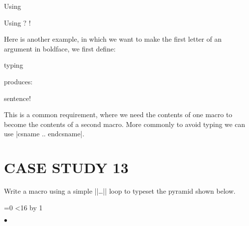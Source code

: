 \begin{teX}
\begin{teX}
\begin{teX}
\begin{teX}
\begin{teX}
\begin{teX}
Using 

\begin{texexample}{Using }{}
\def\letters{xyz}
\def\lookatletters#1#2#3{First arg=#1,Second arg=#2, Third arg=#3 }
\expandafter\lookatletters\letters  ? !
\end{texexample}




Here is another example, in which we want to make the first letter of an argument in boldface, we first define:
\begin{teX}
\def\nextbf#1{{\bf #1}}
\def\meintext{Example sentence!}
\end{teX}
typing
\begin{teX}
\expandafter\nextbf\meintext
\end{teX}

\def\nextbf#1{{\bf #1}}
\def\meintext{Example sentence!}

\noindent produces:

\smallskip
\expandafter\nextbf\meintext
\bigskip



This is a common requirement, where we need the contents of one macro to become the contents of
a second macro. More commonly to avoid typing we can use |csname .. endcsname|.




\chapter{CASE STUDY 13}
Write a macro using a simple |\loop|\ldots|\repeat| loop to typeset the pyramid shown below.

\topline
\def\triangle#1{{\def\bull{}%
\count1=0
\loop
   \edef\bull{$\bullet$\bull}
   \ifnum\count1<#1
      \advance\count1 by 1
      \centerline{\bull}
      \vskip-7.7pt
      \repeat
      \vskip 7.7pt\relax}}

\triangle{16}
\bottomline

\begin{teX}
\def\triangle#1{{\def\bull{}%
\count1=0
\loop
   \edef\bull{$\bullet$\bull}
   \ifnum\count1<#1
      \advance\count1 by 1
      \centerline{\bull}
      \vskip-7.7pt
      \repeat
      \vskip 7.7pt\relax}}
\end{teX}

\def\invertedtriangle#1{{\def\bull{}%
 \count1=10
 \loop
   \edef\bull{$\bullet$\bull}
   \ifnum\count1>0
      \advance\count1 by -1
      \centerline{\bull}
      \vskip-7.7pt
\repeat
\vskip 7.7pt\relax}
}


\end{teX}
\end{teX}
\end{teX}
\end{teX}
\end{teX}
\end{teX}
